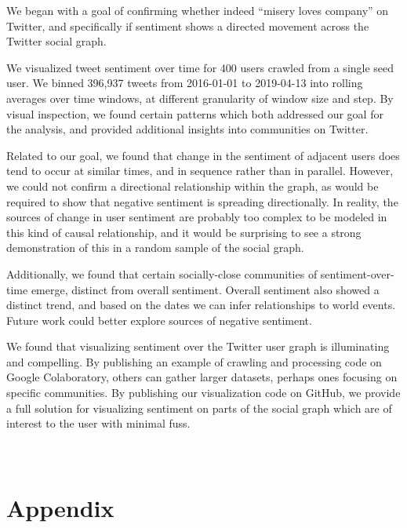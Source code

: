 \documentclass[11pt]{article}
\begin{document}
We began with a goal of confirming whether indeed “misery loves company” on Twitter, and specifically if sentiment shows a directed movement across the Twitter social graph.\newline

We visualized tweet sentiment over time for 400 users crawled from a single seed user. We binned 396,937 tweets from 2016-01-01 to 2019-04-13 into rolling averages over time windows, at different granularity of window size and step. By visual inspection, we found certain patterns which both addressed our goal for the analysis, and provided additional insights into communities on Twitter.\newline

Related to our goal, we found that change in the sentiment of adjacent users does tend to occur at similar times, and in sequence rather than in parallel. However, we could not confirm a directional relationship within the graph, as would be required to show that negative sentiment is spreading directionally. In reality, the sources of change in user sentiment are probably too complex to be modeled in this kind of causal relationship, and it would be surprising to see a strong demonstration of this in a random sample of the social graph.\newline

Additionally, we found that certain socially-close communities of sentiment-over-time emerge, distinct from overall sentiment. Overall sentiment also showed a distinct trend, and based on the dates we can infer relationships to world events. Future work could better explore sources of negative sentiment.\newline

We found that visualizing sentiment over the Twitter user graph is illuminating and compelling. By publishing an example of crawling and processing code on Google Colaboratory, others can gather larger datasets, perhaps ones focusing on specific communities. By publishing our visualization code on GitHub, we provide a full solution for visualizing sentiment on parts of the social graph which are of interest to the user with minimal fuss.

\appendix
\section{\\Appendix}
\end{document}
